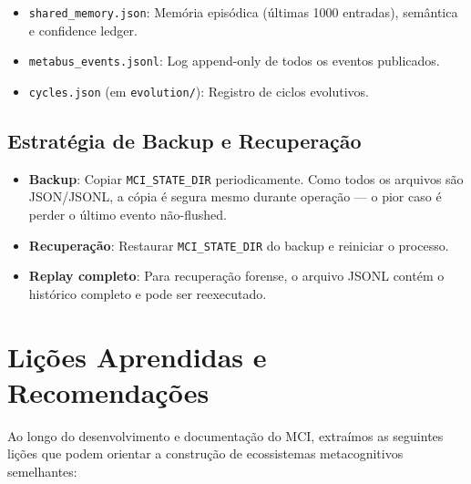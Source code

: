 \begin{itemize}
    \item \texttt{shared\_memory.json}: Memória episódica (últimas 1000 entradas), semântica e confidence ledger.
    \item \texttt{metabus\_events.jsonl}: Log append-only de todos os eventos publicados.
    \item \texttt{cycles.json} (em \texttt{evolution/}): Registro de ciclos evolutivos.
\end{itemize}

\subsection{Estratégia de Backup e Recuperação}

\begin{itemize}
    \item \textbf{Backup}: Copiar \texttt{MCI\_STATE\_DIR} periodicamente. Como todos os arquivos são JSON/JSONL, a cópia é segura mesmo durante operação — o pior caso é perder o último evento não-flushed.
    \item \textbf{Recuperação}: Restaurar \texttt{MCI\_STATE\_DIR} do backup e reiniciar o processo.
    \item \textbf{Replay completo}: Para recuperação forense, o arquivo JSONL contém o histórico completo e pode ser reexecutado.
\end{itemize}

\section{Lições Aprendidas e Recomendações}
\label{sec:lessons-learned}

Ao longo do desenvolvimento e documentação do MCI, extraímos as seguintes lições que podem orientar a construção de ecossistemas metacognitivos semelhantes:

